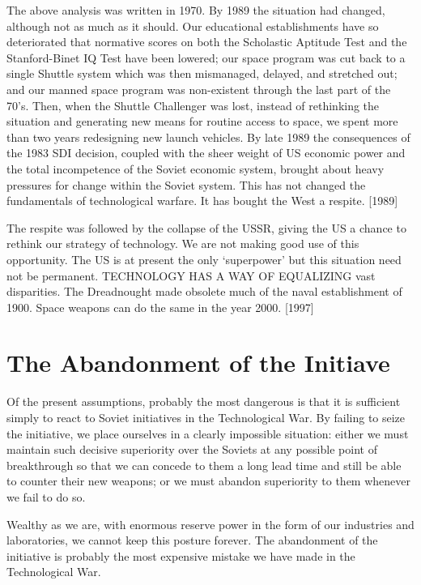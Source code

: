 \begin{mdframed}[backgroundcolor=black!10]
The above analysis was written in 1970. By 1989 the situation had changed, although not as much as it should. Our educational establishments have so deteriorated that normative scores on both the Scholastic Aptitude Test and the Stanford-Binet IQ Test have been lowered; our space program was cut back to a single Shuttle system which was then mismanaged, delayed, and stretched out; and our manned space program was non-existent through the last part of the 70's. Then, when the Shuttle Challenger was lost, instead of rethinking the situation and generating new means for routine access to space, we spent more than two years redesigning new launch vehicles.
By late 1989 the consequences of the 1983 SDI decision, coupled with the sheer weight of US economic power and the total incompetence of the Soviet economic system, brought about heavy pressures for change within the Soviet system. This has not changed the fundamentals of technological warfare. It has bought the West a respite. [1989]

The respite was followed by the collapse of the USSR, giving the US a chance to rethink our strategy of technology. We are not making good use of this opportunity. The US is at present the only ‘superpower’ but this situation need not be permanent. TECHNOLOGY HAS A WAY OF EQUALIZING vast disparities. The Dreadnought made obsolete much of the naval establishment of 1900. Space weapons can do the same in the year 2000. [1997]
\end{mdframed}

\section{The Abandonment of the Initiave}
Of the present assumptions, probably the most dangerous is that it is sufficient simply to react to Soviet initiatives in the Technological War. By failing to seize the initiative, we place ourselves in a clearly impossible situation: either we must maintain such decisive superiority over the Soviets at any possible point of breakthrough so that we can concede to them a long lead time and still be able to counter their new weapons; or we must abandon superiority to them whenever we fail to do so.

Wealthy as we are, with enormous reserve power in the form of our industries and laboratories, we cannot keep this posture forever. The abandonment of the initiative is probably the most expensive mistake we have made in the Technological War.

